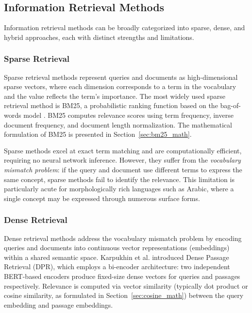 \subsection{Information Retrieval Methods}
\label{sec:ir_methods}

Information retrieval methods can be broadly categorized into sparse, dense, and hybrid approaches, each with distinct strengths and limitations.

\subsubsection{Sparse Retrieval}
\label{sec:sparse_retrieval}

Sparse retrieval methods represent queries and documents as high-dimensional sparse vectors, where each dimension corresponds to a term in the vocabulary and the value reflects the term's importance. The most widely used sparse retrieval method is BM25, a probabilistic ranking function based on the bag-of-words model \cite{robertson_2009_probabilistic}. BM25 computes relevance scores using term frequency, inverse document frequency, and document length normalization. The mathematical formulation of BM25 is presented in Section~\ref{sec:bm25_math}.

Sparse methods excel at exact term matching and are computationally efficient, requiring no neural network inference. However, they suffer from the \textit{vocabulary mismatch problem}: if the query and document use different terms to express the same concept, sparse methods fail to identify the relevance. This limitation is particularly acute for morphologically rich languages such as Arabic, where a single concept may be expressed through numerous surface forms.

\subsubsection{Dense Retrieval}
\label{sec:dense_retrieval}

Dense retrieval methods address the vocabulary mismatch problem by encoding queries and documents into continuous vector representations (embeddings) within a shared semantic space. Karpukhin et al. \cite{karpukhin_2020_dense} introduced Dense Passage Retrieval (DPR), which employs a bi-encoder architecture: two independent BERT-based encoders produce fixed-size dense vectors for queries and passages respectively. Relevance is computed via vector similarity (typically dot product or cosine similarity, as formulated in Section~\ref{sec:cosine_math}) between the query embedding and passage embeddings.

